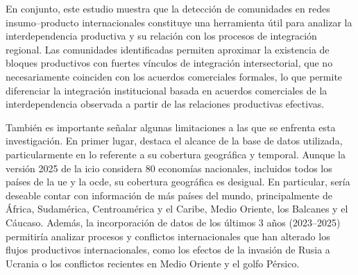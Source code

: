 En conjunto, este estudio muestra que la detección de comunidades en redes insumo--producto internacionales constituye una herramienta útil para analizar la interdependencia productiva y su relación con los procesos de integración regional. Las comunidades identificadas permiten aproximar la existencia de bloques productivos con fuertes vínculos de integración intersectorial, que no necesariamente coinciden con los acuerdos comerciales formales, lo que permite diferenciar la integración institucional basada en acuerdos comerciales de la interdependencia observada a partir de las relaciones productivas efectivas.

También es importante señalar algunas limitaciones a las que se enfrenta esta investigación. En primer lugar, destaca el alcance de la base de datos utilizada, particularmente en lo referente a su cobertura geográfica y temporal. Aunque la versión 2025 de la \gls{icio} considera 80 economías nacionales, incluidos todos los países de la \gls{ue} y la \gls{ocde}, su cobertura geográfica es desigual. En particular, sería deseable contar con información de más países del mundo, principalmente de África, Sudamérica, Centroamérica y el Caribe, Medio Oriente, los Balcanes y el Cáucaso. Además, la incorporación de datos de los últimos 3 años (2023--2025) permitiría analizar procesos y conflictos internacionales que han alterado los flujos productivos internacionales, como los efectos de la invasión de Rusia a Ucrania o los conflictos recientes en Medio Oriente y el golfo Pérsico.

